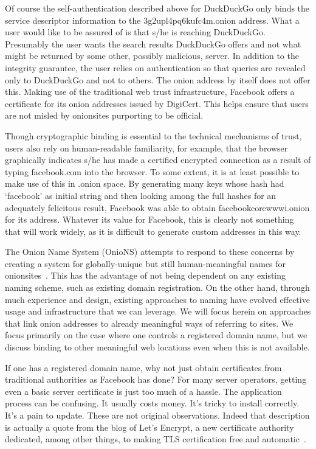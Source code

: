 \documentclass[10pt, conference, compsocconf]{styles/IEEEtran}
\begin{document}
Of course the self-authentication described above 
for DuckDuckGo only binds the
service descriptor information to the 3g2upl4pq6kufc4m.onion
address. What a user would like to be assured of is that s/he is
reaching DuckDuckGo. Presumably the user wants the search results
DuckDuckGo offers and not what might be returned by some other,
possibly malicious, server.  In addition to the integrity guarantee,
the user relies on authentication so that queries are revealed only to
DuckDuckGo and not to others. The onion address by itself does not
offer this. Making use of the traditional web trust infrastructure,
Facebook offers a certificate for its onion addresses
issued by DigiCert.  This helps ensure that users are not misled by
onionsites purporting to be official.

Though cryptographic binding is essential to the technical mechanisms
of trust, users also rely on human-readable familiarity, for example,
that the browser graphically indicates s/he has made a certified
encrypted connection as a result of typing facebook.com into the
browser.  To some extent, it is at least possible to make use of this
in .onion space. By generating many keys whose hash had `facebook' as
initial string and then looking among the full hashes for an
adequately felicitous result, Facebook was able to obtain
facebookcorewwwi.onion for its address. Whatever its value for
Facebook, this is clearly not something that will work widely, as it
is difficult to generate custom addresses in this way. 

The Onion Name System (OnioNS) attempts to respond to these concerns
by creating a system for globally-unique but still human-meaningful
names for onionsites~\cite{vickers-onions}.  This has the advantage of
not being dependent on any existing naming scheme, such as existing
domain registration. On the other hand, through much experience and
design, existing approaches to naming have evolved effective usage and
infrastructure that we can leverage. We will focus herein on
approaches that link onion addresses to already meaningful ways of
referring to sites. We focus primarily on the case where one controls
a registered domain name, but we discuss binding to other meaningful
web locations even when this is not available.

If one has a registered domain name,
why not just obtain certificates from traditional authorities as
Facebook has done? For many server operators, getting
even a basic server certificate is just too much of a hassle. The
application process can be confusing. It usually costs money. It's
tricky to install correctly. It's a pain to update. 
These are not original observations. Indeed that description is
actually a quote from the blog of Let's Encrypt, a new certificate
authority dedicated, among other things, to making TLS certification
free and automatic~\cite{lets-encrypt}.
\end{document}
